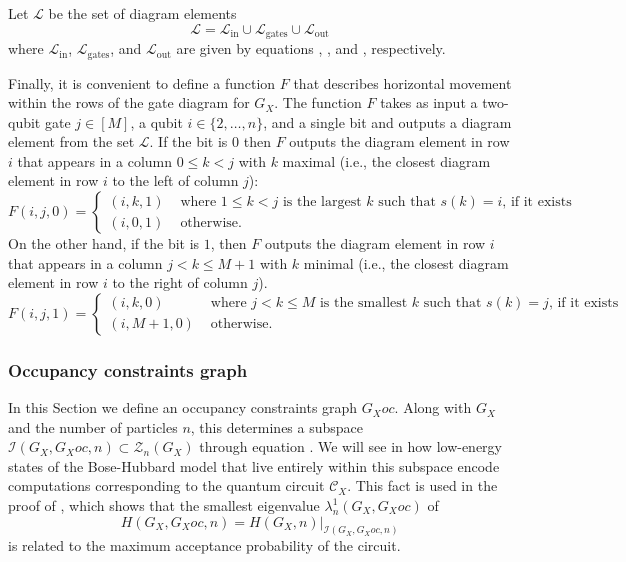 \documentclass[../thesis-main/thesis-main]{subfiles}
\begin{document}
\begin{definition}
\label{defn:scriptL}Let $\mathcal{L}$ be the set of diagram
elements
\begin{equation}
\mathcal{L}=\mathcal{L}_{\text{in}}\cup\mathcal{L}_{\mathrm{gates}}\cup\mathcal{L}_{\text{out}}
\end{equation}
where $\mathcal{L}_{\text{in}}$, $\mathcal{L}_{\mathrm{gates}}$, and $\mathcal{L}_{\text{out}}$ are given by equations , , and , respectively.
\end{definition}

Finally, it is convenient to define a function $F$ that describes horizontal movement within the rows of the gate diagram for $G_X$. The function $F$ takes as input a two-qubit gate $j\in[M]$, a qubit $i\in\{2,\ldots,n\}$, and a single bit and outputs a diagram element from the set $\mathcal{L}$. If the bit is $0$ then $F$ outputs the diagram element in row $i$ that appears in a column $0\leq k<j$ with $k$ maximal (i.e., the closest diagram element in row $i$ to the left of column $j$):
\begin{equation}
F(i,j,0)=\begin{cases}
(i,k,1) & \text{ where }1\leq k<j\text{ is the largest }k\text{ such that }s(k)=i\text{, if it exists}\\
(i,0,1) & \text{ otherwise.}
\end{cases}\label{eq:F_bit0}
\end{equation}
On the other hand, if the bit is $1$, then $F$ outputs the diagram element in row $i$ that appears in a column $j<k\leq M+1$ with $k$ minimal (i.e., the closest diagram element in row $i$ to the right of column $j$). 
\begin{equation}
F(i,j,1)=\begin{cases}
(i,k,0) & \text{ where }j<k\leq M\text{ is the smallest }k\text{ such that }s(k)=j\text{, if it exists}\\
(i,M+1,0) & \text{ otherwise}.
\end{cases}\label{eq:F_bit1}
\end{equation}

\subsubsection{Occupancy constraints graph}

In this Section we define an occupancy constraints graph $G_Xoc$. Along with $G_X$ and the number of particles $n$, this determines a subspace $\mathcal{I}(G_X,G_Xoc,n)\subset\mathcal{Z}_{n}(G_X)$ through equation . We will see in  how low-energy states of the Bose-Hubbard model that live entirely within this subspace encode computations corresponding to the quantum circuit $\mathcal{C}_{X}$. This fact is used in the proof of , which shows that the smallest eigenvalue $\lambda_{n}^{1}(G_X,G_Xoc)$ of
\begin{equation}
H(G_X,G_Xoc,n)=H(G_X,n)\big|_{\mathcal{I}(G_X,G_Xoc,n)}
\end{equation}
is related to the maximum acceptance probability of the circuit.
\end{document}
